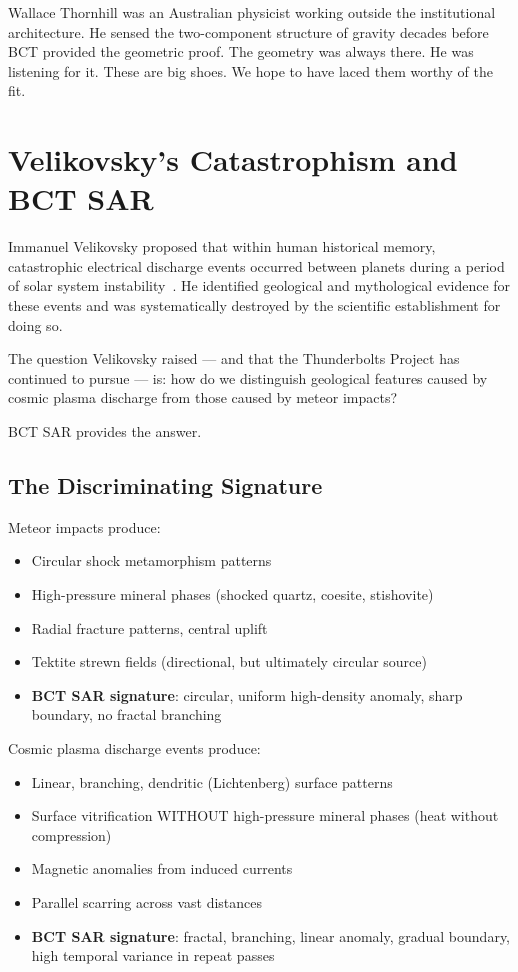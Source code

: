 \documentclass[twocolumn,10pt]{article}
\begin{document}
Wallace Thornhill was an Australian physicist working outside the
institutional architecture. He sensed the two-component structure
of gravity decades before BCT provided the geometric proof.
The geometry was always there. He was listening for it.
These are big shoes. We hope to have laced them worthy of the fit.

\section{Velikovsky's Catastrophism and BCT SAR}

Immanuel Velikovsky proposed that within human historical memory,
catastrophic electrical discharge events occurred between planets
during a period of solar system instability~\cite{velikovsky}.
He identified geological and mythological evidence for these events
and was systematically destroyed by the scientific establishment
for doing so.

The question Velikovsky raised --- and that the Thunderbolts Project
has continued to pursue --- is: how do we distinguish geological
features caused by cosmic plasma discharge from those caused by
meteor impacts?

BCT SAR provides the answer.

\subsection{The Discriminating Signature}

Meteor impacts produce:
\begin{itemize}
\item Circular shock metamorphism patterns
\item High-pressure mineral phases (shocked quartz, coesite, stishovite)
\item Radial fracture patterns, central uplift
\item Tektite strewn fields (directional, but ultimately circular source)
\item \textbf{BCT SAR signature}: circular, uniform high-density anomaly,
  sharp boundary, no fractal branching
\end{itemize}

Cosmic plasma discharge events produce:
\begin{itemize}
\item Linear, branching, dendritic (Lichtenberg) surface patterns
\item Surface vitrification WITHOUT high-pressure mineral phases
  (heat without compression)
\item Magnetic anomalies from induced currents
\item Parallel scarring across vast distances
\item \textbf{BCT SAR signature}: fractal, branching, linear anomaly,
  gradual boundary, high temporal variance in repeat passes
\end{itemize}
\end{document}
